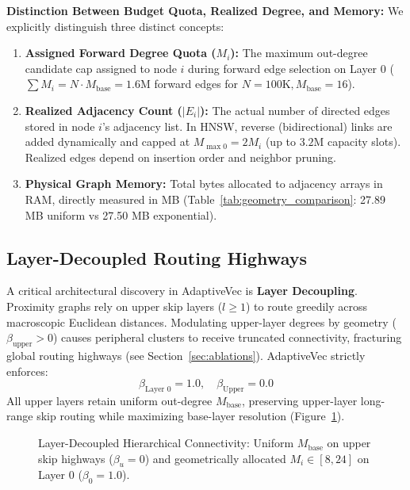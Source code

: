 \documentclass[10pt,journal,compsoc]{IEEEtran}
\begin{document}
\textbf{Distinction Between Budget Quota, Realized Degree, and Memory:}
We explicitly distinguish three distinct concepts:
\begin{enumerate}
    \item \textbf{Assigned Forward Degree Quota ($M_i$):} The maximum out-degree candidate cap assigned to node $i$ during forward edge selection on Layer 0 ($\sum M_i = N \cdot M_{\text{base}} = 1.6\text{M}$ forward edges for $N=100\text{K}, M_{\text{base}}=16$).
    \item \textbf{Realized Adjacency Count ($|E_i|$):} The actual number of directed edges stored in node $i$'s adjacency list. In HNSW, reverse (bidirectional) links are added dynamically and capped at $M_{\max 0} = 2 M_i$ (up to $3.2\text{M}$ capacity slots). Realized edges depend on insertion order and neighbor pruning.
    \item \textbf{Physical Graph Memory:} Total bytes allocated to adjacency arrays in RAM, directly measured in MB (Table~\ref{tab:geometry_comparison}: 27.89 MB uniform vs 27.50 MB exponential).
\end{enumerate}

\subsection{Layer-Decoupled Routing Highways}
A critical architectural discovery in AdaptiveVec is \textbf{Layer Decoupling}. Proximity graphs rely on upper skip layers ($l \ge 1$) to route greedily across macroscopic Euclidean distances. Modulating upper-layer degrees by geometry ($\beta_{\text{upper}} > 0$) causes peripheral clusters to receive truncated connectivity, fracturing global routing highways (see Section~\ref{sec:ablations}). AdaptiveVec strictly enforces:
\begin{equation}
\beta_{\text{Layer 0}} = 1.0, \quad \beta_{\text{Upper}} = 0.0
\end{equation}
All upper layers retain uniform out-degree $M_{\text{base}}$, preserving upper-layer long-range skip routing while maximizing base-layer resolution (Figure~\ref{fig:hierarchy_allocation}).

\begin{figure}[t]
\centering

\caption{Layer-Decoupled Hierarchical Connectivity: Uniform $M_{\text{base}}$ on upper skip highways ($\beta_u=0$) and geometrically allocated $M_i \in [8, 24]$ on Layer 0 ($\beta_0=1.0$).}
\label{fig:hierarchy_allocation}
\end{figure}
\end{document}
